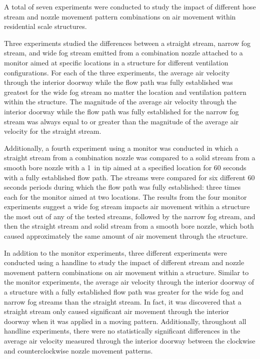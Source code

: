 \documentclass[12pt,oneside]{book}
\begin{document}
A total of seven experiments were conducted to study the impact of different hose stream and nozzle movement pattern combinations on air movement within residential scale structures. 

Three experiments studied the differences between a straight stream, narrow fog stream, and wide fog stream emitted from a combination nozzle attached to a monitor aimed at specific locations in a structure for different ventilation configurations. For each of the three experiments, the average air velocity through the interior doorway while the flow path was fully established was greatest for the wide fog stream no matter the location and ventilation pattern within the structure. The magnitude of the average air velocity through the interior doorway while the flow path was fully established for the narrow fog stream was always equal to or greater than the magnitude of the average air velocity for the straight stream. 

Additionally, a fourth experiment using a monitor was conducted in which a straight stream from a combination nozzle was compared to a solid stream from a smooth bore nozzle with a 1~in tip aimed at a specified location for 60 seconds with a fully established flow path. The streams were compared for six different 60 seconds periods during which the flow path was fully established: three times each for the monitor aimed at two locations. The results from the four monitor experiments suggest a wide fog stream impacts air movement within a structure the most out of any of the tested streams, followed by the narrow fog stream, and then the straight stream and solid stream from a smooth bore nozzle, which both caused approximately the same amount of air movement through the structure.

In addition to the monitor experiments, three different experiments were conducted using a handline to study the impact of different stream and nozzle movement pattern combinations on air movement within a structure. Similar to the monitor experiments, the average air velocity through the interior doorway of a structure with a fully established flow path was greater for the wide fog and narrow fog streams than the straight stream. In fact, it was discovered that a straight stream only caused significant air movement through the interior doorway when it was applied in a moving pattern. Additionally, throughout all handline experiments, there were no statistically significant differences in the average air velocity measured through the interior doorway between the clockwise and counterclockwise nozzle movement patterns.
\end{document}
